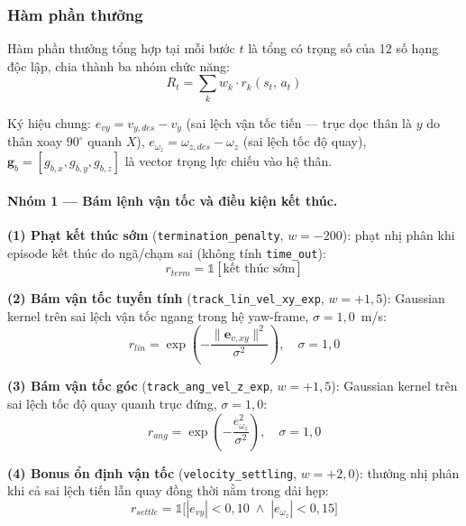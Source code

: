 \subsubsection{Hàm phần thưởng}
\label{sec:reward_fn}

Hàm phần thưởng tổng hợp tại mỗi bước $t$ là tổng có trọng số của 12 số hạng
độc lập, chia thành ba nhóm chức năng:
\begin{equation}
    R_t = \sum_{k} w_k \cdot r_k(s_t,\,a_t)
    \label{eq:total_reward}
\end{equation}

Ký hiệu chung: $e_{vy}=v_{y,des}-v_{y}$ (sai lệch vận tốc tiến --- trục dọc
thân là $y$ do thân xoay $90^\circ$ quanh $X$), $e_{\omega_z}=\omega_{z,des}-\omega_{z}$
(sai lệch tốc độ quay), $\mathbf{g}_b=[g_{b,x},g_{b,y},g_{b,z}]$ là vector
trọng lực chiếu vào hệ thân.

\paragraph{Nhóm 1 --- Bám lệnh vận tốc và điều kiện kết thúc.}

\textbf{(1) Phạt kết thúc sớm} (\texttt{termination\_penalty}, $w=-200$):
phạt nhị phân khi episode kết thúc do ngã/chạm sai (không tính \texttt{time\_out}):
\begin{equation}
    r_{term} = \mathbb{1}[\text{kết thúc sớm}]
    \label{eq:rew_term}
\end{equation}

\textbf{(2) Bám vận tốc tuyến tính} (\texttt{track\_lin\_vel\_xy\_exp},
$w=+1{,}5$): Gaussian kernel trên sai lệch vận tốc ngang trong hệ yaw-frame,
$\sigma=1{,}0$~m/s:
\begin{equation}
    r_{lin} = \exp\!\left(-\frac{\lVert\mathbf{e}_{v,xy}\rVert^2}{\sigma^2}\right),
    \quad \sigma=1{,}0
    \label{eq:rew_lin}
\end{equation}

\textbf{(3) Bám vận tốc góc} (\texttt{track\_ang\_vel\_z\_exp}, $w=+1{,}5$):
Gaussian kernel trên sai lệch tốc độ quay quanh trục đứng, $\sigma=1{,}0$:
\begin{equation}
    r_{ang} = \exp\!\left(-\frac{e_{\omega_z}^2}{\sigma^2}\right),
    \quad \sigma=1{,}0
    \label{eq:rew_ang}
\end{equation}

\textbf{(4) Bonus ổn định vận tốc} (\texttt{velocity\_settling}, $w=+2{,}0$):
thưởng nhị phân khi cả sai lệch tiến lẫn quay đồng thời nằm trong dải hẹp:
\begin{equation}
    r_{settle} = \mathbb{1}\!\bigl[|e_{vy}| < 0{,}10\;\wedge\;
                 |e_{\omega_z}| < 0{,}15\bigr]
    \label{eq:rew_settle}
\end{equation}

